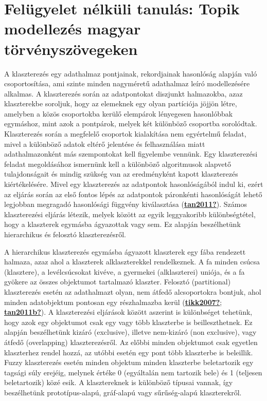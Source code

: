 \documentclass[
]{book}
\begin{document}
\hypertarget{feluxfcgyelet-nuxe9lkuxfcli-tanuluxe1s-topik-modellezuxe9s-magyar-tuxf6rvuxe9nyszuxf6vegeken}{%
\chapter{Felügyelet nélküli tanulás: Topik modellezés magyar
törvényszövegeken}\label{feluxfcgyelet-nuxe9lkuxfcli-tanuluxe1s-topik-modellezuxe9s-magyar-tuxf6rvuxe9nyszuxf6vegeken}}

A klaszterezés egy adathalmaz pontjainak, rekordjainak hasonlóság
alapján való csoportosítása, ami szinte minden nagyméretű adathalmaz
leíró modellezésére alkalmas. A klaszterezés során az adatpontokat
diszjunkt halmazokba, azaz klaszterekbe soroljuk, hogy az elemeknek egy
olyan partíciója jöjjön létre, amelyben a közös csoportokba kerülő
elempárok lényegesen hasonlóbbak egymáshoz, mint azok a pontpárok,
melyek két különböző csoportba sorolódtak. Klaszterezés során a
megfelelő csoportok kialakítása nem egyértelmű feladat, mivel a
különböző adatok eltérő jelentése és felhasználása miatt
adathalmazonként más szempontokat kell figyelembe vennünk. Egy
klaszterezési feladat megoldásához ismernünk kell a különböző
algoritmusok alapvető tulajdonságait és mindig szükség van az
eredményként kapott klaszterezés kiértékelésére. Mivel egy klaszterezés
az adatpontok hasonlóságából indul ki, ezért az eljárás során az első
fontos lépés az adatpontok páronkénti hasonlóságát lehető legjobban
megragadó hasonlósági függvény kiválasztása
(\protect\hyperlink{ref-tan2011}{\textbf{tan2011?}}). Számos
klaszterezési eljárás létezik, melyek között az egyik leggyakoribb
különbségtétel, hogy a klaszterek egymásba ágyazottak vagy sem. Ez
alapján beszélhetünk hierarchikus és felosztó klaszterezésről.

A hierarchikus klaszterezés egymásba ágyazott klaszterek egy fába
rendezett halmaza, azaz ahol a klaszterek alklaszterekkel rendelkeznek.
A fa minden csúcsa (klasztere), a levélcsúcsokat kivéve, a gyermekei
(alklaszterei) uniója, és a fa gyökere az összes objektumot tartalmazó
klaszter. Felosztó (partitional) klaszterezés esetén az adathalmazt
olyan, nem átfedő alcsoportokra bontjuk, ahol minden adatobjektum
pontosan egy részhalmazba kerül
(\protect\hyperlink{ref-tikk2007}{\textbf{tikk2007?}};
\protect\hyperlink{ref-tan2011b}{\textbf{tan2011b?}}). A klaszterezési
eljárások között aszerint is különbséget tehetünk, hogy azok egy
objektumot csak egy vagy több klaszterbe is beilleszthetnek. Ez alapján
beszélhetünk kizáró (exclusive), illetve nem-kizáró (non exclusive),
vagy átfedő (overlapping) klaszterezésről. Az előbbi minden objektumot
csak egyetlen klaszterhez rendel hozzá, az utóbbi esetén egy pont több
klaszterbe is beleillik. Fuzzy klaszterezés esetén minden objektum
minden klaszterbe beletartozik egy tagsági súly erejéig, melynek értéke
0 (egyáltalán nem tartozik bele) és 1 (teljesen beletartozik) közé esik.
A klasztereknek is különböző típusai vannak, így beszélhetünk
prototípus-alapú, gráf-alapú vagy sűrűség-alapú klaszterekről.
\end{document}
